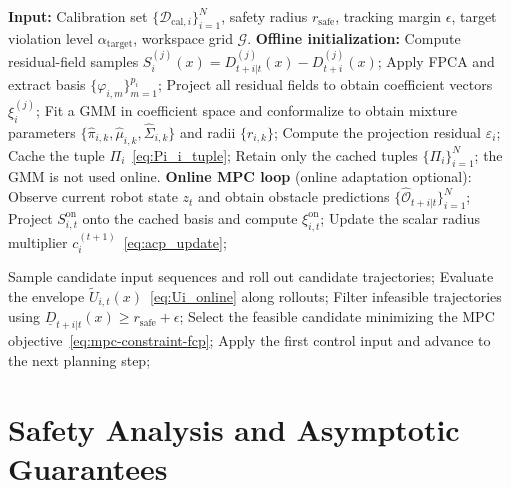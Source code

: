 \documentclass[lettersize,journal]{IEEEtran}
\begin{document}
\begin{algorithm}[t]
\caption{Functional CP-informed MPC with offline GMM initialization and optional online adaptive update}
\label{alg:fcp_mpc_acp}
\begin{algorithmic}[1]
\STATE \textbf{Input:} Calibration set $\{\mathcal D_{\mathrm{cal},i}\}_{i=1}^N$, safety radius $r_{\mathrm{safe}}$, tracking margin $\epsilon$, target violation level $\alpha_{\mathrm{target}}$, workspace grid $\mathcal G$.
\STATE \textbf{Offline initialization:}
    \STATE Compute residual-field samples $S_i^{(j)}(x)=D_{t+i|t}^{(j)}(x)-D_{t+i}^{(j)}(x)$;
    \STATE Apply FPCA and extract basis $\{\varphi_{i,m}\}_{m=1}^{p_i}$;
    \STATE Project all residual fields to obtain coefficient vectors $\xi_i^{(j)}$;
    \STATE Fit a GMM in coefficient space and conformalize to obtain mixture parameters $\{\widehat\pi_{i,k},\widehat\mu_{i,k},\widehat\Sigma_{i,k}\}$ and radii $\{r_{i,k}\}$;
    \STATE Compute the projection residual $\varepsilon_i$;
    \STATE Cache the tuple $\Pi_i$~\eqref{eq:Pi_i_tuple};
\ENDFOR
\STATE Retain only the cached tuples $\{\Pi_i\}_{i=1}^N$; the GMM is not used online.
\STATE \textbf{Online MPC loop} (online adaptation optional):
    \STATE Observe current robot state $z_t$ and obtain obstacle predictions $\{\widehat{\mathcal O}_{t+i|t}\}_{i=1}^N$;
        \STATE Project $S^{\mathrm{on}}_{i,t}$ onto the cached basis and compute $\xi^{\mathrm{on}}_{i,t}$;
        \STATE Update the scalar radius multiplier $c_i^{(t+1)}$~\eqref{eq:acp_update};

    \ENDFOR
    \STATE Sample candidate input sequences and roll out candidate trajectories;
    \STATE Evaluate the envelope $\widetilde U_{i,t}(x)$~\eqref{eq:Ui_online} along rollouts;
    \STATE Filter infeasible trajectories using $\underline D_{t+i|t}(x)\ge r_{\mathrm{safe}}+\epsilon$;
    \STATE Select the feasible candidate minimizing the MPC objective~\eqref{eq:mpc-constraint-fcp};
    \STATE Apply the first control input and advance to the next planning step;
\ENDFOR
\end{algorithmic}
\end{algorithm}

\section{Safety Analysis and Asymptotic Guarantees}
\end{document}
